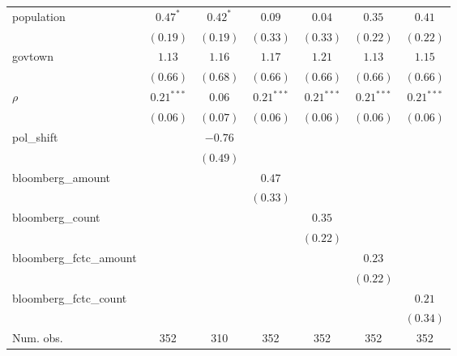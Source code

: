 \begin{table}[!h]
\begin{center}
\begin{tabular}{l c c c c c c }
population              & $0.47^{*}$   & $0.42^{*}$   & $0.09$       & $0.04$       & $0.35$       & $0.41$       \\
                        & $(0.19)$     & $(0.19)$     & $(0.33)$     & $(0.33)$     & $(0.22)$     & $(0.22)$     \\
govtown                 & $1.13$       & $1.16$       & $1.17$       & $1.21$       & $1.13$       & $1.15$       \\
                        & $(0.66)$     & $(0.68)$     & $(0.66)$     & $(0.66)$     & $(0.66)$     & $(0.66)$     \\
$\rho$                  & $0.21^{***}$ & $0.06$       & $0.21^{***}$ & $0.21^{***}$ & $0.21^{***}$ & $0.21^{***}$ \\
                        & $(0.06)$     & $(0.07)$     & $(0.06)$     & $(0.06)$     & $(0.06)$     & $(0.06)$     \\
pol\_shift              &              & $-0.76$      &              &              &              &              \\
                        &              & $(0.49)$     &              &              &              &              \\
bloomberg\_amount       &              &              & $0.47$       &              &              &              \\
                        &              &              & $(0.33)$     &              &              &              \\
bloomberg\_count        &              &              &              & $0.35$       &              &              \\
                        &              &              &              & $(0.22)$     &              &              \\
bloomberg\_fctc\_amount &              &              &              &              & $0.23$       &              \\
                        &              &              &              &              & $(0.22)$     &              \\
bloomberg\_fctc\_count  &              &              &              &              &              & $0.21$       \\
                        &              &              &              &              &              & $(0.34)$     \\
\midrule
Num. obs.               & 352          & 310          & 352          & 352          & 352          & 352          \\

\end{tabular}
\end{center}
\end{table}
